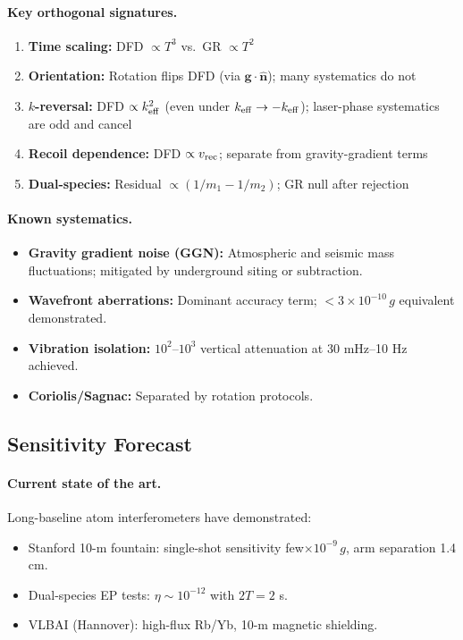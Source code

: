 \paragraph{Key orthogonal signatures.}
\begin{enumerate}
\item \textbf{Time scaling:} DFD $\propto T^3$ vs.\ GR $\propto T^2$
\item \textbf{Orientation:} Rotation flips DFD (via $\mathbf{g}\cdot\hat{\mathbf{n}}$); many systematics do not
\item \textbf{$k$-reversal:} DFD $\propto k_{\rm eff}^2$ (even under $k_{\rm eff} \to -k_{\rm eff}$); laser-phase systematics are odd and cancel
\item \textbf{Recoil dependence:} DFD $\propto v_{\rm rec}$; separate from gravity-gradient terms
\item \textbf{Dual-species:} Residual $\propto (1/m_1 - 1/m_2)$; GR null after rejection
\end{enumerate}

\paragraph{Known systematics.}
\begin{itemize}
\item \textbf{Gravity gradient noise (GGN):} Atmospheric and seismic mass fluctuations; mitigated by underground siting or subtraction.
\item \textbf{Wavefront aberrations:} Dominant accuracy term; $<3 \times 10^{-10}\,g$ equivalent demonstrated.
\item \textbf{Vibration isolation:} $10^2$--$10^3$ vertical attenuation at 30 mHz--10 Hz achieved.
\item \textbf{Coriolis/Sagnac:} Separated by rotation protocols.
\end{itemize}

\subsection{Sensitivity Forecast}\label{sec:mw-sensitivity}

\paragraph{Current state of the art.}
Long-baseline atom interferometers have demonstrated:
\begin{itemize}
\item Stanford 10-m fountain: single-shot sensitivity few$\times 10^{-9}\,g$, arm separation 1.4 cm.
\item Dual-species EP tests: $\eta \sim 10^{-12}$ with $2T = 2$ s.
\item VLBAI (Hannover): high-flux Rb/Yb, 10-m magnetic shielding.
\end{itemize}

